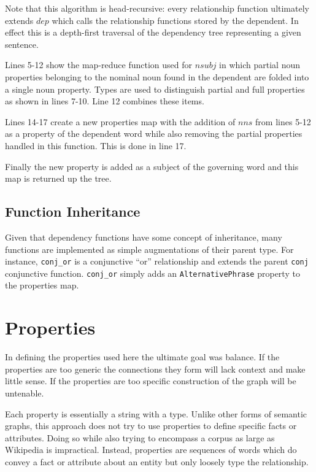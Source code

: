 Note that this algorithm is head-recursive: every relationship function ultimately extends $dep$ which calls the relationship functions stored by the dependent.  In effect this is a depth-first traversal of the dependency tree representing a given sentence.  %

Lines 5-12 show the map-reduce function used for $nsubj$ in which partial noun properties belonging to the nominal noun found in the dependent are folded into a single noun property.    Types are used to distinguish partial and full properties as shown in lines 7-10.  Line 12 combines these items.

Lines 14-17 create a new properties map with the addition of $nns$ from lines 5-12 as a property of the dependent word while also removing the partial properties handled in this function.  This is done in line 17.

Finally the new property is added as a subject of the governing word and this map is returned up the tree.

\subsection{Function Inheritance}

Given that dependency functions have some concept of inheritance, many functions are implemented as simple augmentations of their parent type.  For instance, \verb|conj_or| is a conjunctive ``or'' relationship and extends the parent \verb|conj| conjunctive function.  \verb|conj_or| simply adds an \verb|AlternativePhrase| property to the properties map.



\section{Properties}
\label{algo:properties}

In defining the properties used here the ultimate goal was balance.  If the properties are too generic the connections they form will lack context and make little sense.  If the properties are too specific construction of the graph will be untenable.  

Each property is essentially a string with a type.  Unlike other forms of semantic graphs, this approach does not try to use properties to define specific facts or attributes.  Doing so while also trying to encompass a corpus as large as Wikipedia is impractical.  Instead, properties are sequences of words which do convey a fact or attribute about an entity but only loosely type the relationship.  

